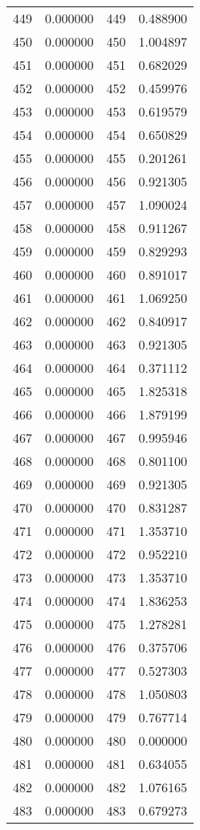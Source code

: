 \documentclass[12pt]{article}
\begin{document}
\begin{longtable}{@{}cccc@{}}
449 & 0.000000 & 449 & 0.488900 \\
450 & 0.000000 & 450 & 1.004897 \\
451 & 0.000000 & 451 & 0.682029 \\
452 & 0.000000 & 452 & 0.459976 \\
453 & 0.000000 & 453 & 0.619579 \\
454 & 0.000000 & 454 & 0.650829 \\
455 & 0.000000 & 455 & 0.201261 \\
456 & 0.000000 & 456 & 0.921305 \\
457 & 0.000000 & 457 & 1.090024 \\
458 & 0.000000 & 458 & 0.911267 \\
459 & 0.000000 & 459 & 0.829293 \\
460 & 0.000000 & 460 & 0.891017 \\
461 & 0.000000 & 461 & 1.069250 \\
462 & 0.000000 & 462 & 0.840917 \\
463 & 0.000000 & 463 & 0.921305 \\
464 & 0.000000 & 464 & 0.371112 \\
465 & 0.000000 & 465 & 1.825318 \\
466 & 0.000000 & 466 & 1.879199 \\
467 & 0.000000 & 467 & 0.995946 \\
468 & 0.000000 & 468 & 0.801100 \\
469 & 0.000000 & 469 & 0.921305 \\
470 & 0.000000 & 470 & 0.831287 \\
471 & 0.000000 & 471 & 1.353710 \\
472 & 0.000000 & 472 & 0.952210 \\
473 & 0.000000 & 473 & 1.353710 \\
474 & 0.000000 & 474 & 1.836253 \\
475 & 0.000000 & 475 & 1.278281 \\
476 & 0.000000 & 476 & 0.375706 \\
477 & 0.000000 & 477 & 0.527303 \\
478 & 0.000000 & 478 & 1.050803 \\
479 & 0.000000 & 479 & 0.767714 \\
480 & 0.000000 & 480 & 0.000000 \\
481 & 0.000000 & 481 & 0.634055 \\
482 & 0.000000 & 482 & 1.076165 \\
483 & 0.000000 & 483 & 0.679273 \\

\end{longtable}
\end{document}
